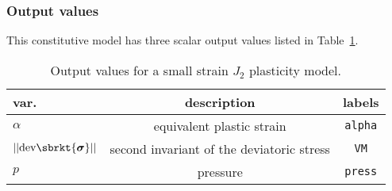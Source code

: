 \subsubsection{Output values}
This constitutive model has three scalar output values listed in
Table~\ref{tab.mat.SS.J2.LinearHardening.output}.
\begin{table}[h]
\caption{\label{tab.mat.SS.J2.LinearHardening.output} Output values 
for a small strain $J_2$ plasticity model.}
\begin{center}
\begin{tabular}[c]{|l|c|c|}
\hline
 \parbox[c]{0.75in}{\centering \textbf{var.}}
&\parbox[c]{3.0in}{\raggedright \textbf{description}}
&\parbox[c]{1.0in}{\raggedright  \textbf{labels}}\\
\hline
\parbox[c]{0.75in}{\centering $\alpha$} & 
\parbox[c]{3.0in}{\raggedright equivalent plastic strain} &
\parbox[c]{1.0in}{\raggedright \texttt{alpha}}\\
\hline
\parbox[c]{0.75in}{\centering $||\textrm{dev}\sbrkt{\boldsymbol{\sigma}}||$}  & 
\parbox[c]{3.0in}{\raggedright second invariant of the deviatoric stress} &
\parbox[c]{1.0in}{\raggedright \texttt{VM}}\\
\hline
\parbox[c]{0.75in}{\centering $p$}  & 
\parbox[c]{3.0in}{\raggedright pressure} &
\parbox[c]{1.0in}{\raggedright \texttt{press}}\\
\hline
\end{tabular}
\end{center}
\end{table}

